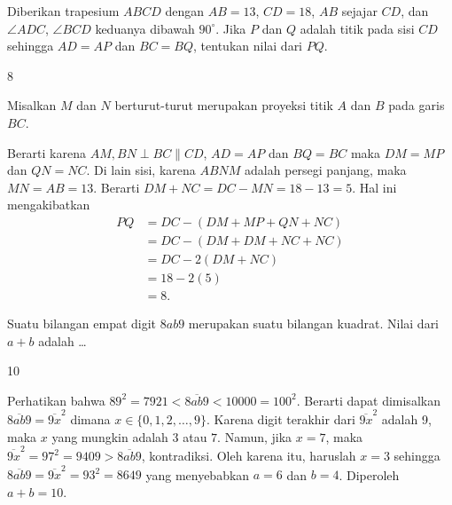 \begin{soalbaru}
Diberikan trapesium $ABCD$ dengan $AB = 13$, $CD = 18$, $AB$ sejajar $CD$,
dan $\angle ADC$, $\angle BCD$ keduanya dibawah $90^\circ$. Jika $P$ dan $Q$ adalah titik pada sisi $CD$ sehingga $AD = AP$ dan $BC = BQ$, tentukan nilai dari $PQ$.
\end{soalbaru}
\begin{jawaban}
8
\end{jawaban}
\begin{solusi}
Misalkan $M$ dan $N$ berturut-turut merupakan proyeksi titik $A$ dan $B$ pada garis $BC$. 
\begin{center}
\end{center}
Berarti karena $AM, BN \perp BC \parallel CD$, $AD=AP$ dan $BQ=BC$ maka $DM=MP$ dan $QN=NC$. Di lain sisi, karena $ABNM$ adalah persegi panjang, maka $MN=AB=13$. Berarti $DM+NC=DC-MN=18-13=5$. Hal ini mengakibatkan 
\begin{align*}
PQ &= DC-(DM+MP+QN+NC)\\
&= DC - (DM+DM+NC+NC)\\
&= DC-2(DM+NC)\\
&= 18 - 2(5)\\
&= \boxed{8}.
\end{align*}
\end{solusi}

\begin{soalbaru}
Suatu bilangan empat digit $8ab9$ merupakan suatu bilangan kuadrat. Nilai dari $a+b$ adalah \dots
\end{soalbaru}
\begin{jawaban}
10
\end{jawaban}
\begin{solusi}
Perhatikan bahwa $89^2 = 7921 < \overline{8ab9} < 10000 = 100^2$. Berarti dapat dimisalkan $\overline{8ab9} = \overline{9x}^2$ dimana $x \in \{0,1,2,\dots, 9\}$. Karena digit terakhir dari $\overline{9x}^2$ adalah 9, maka $x$ yang mungkin adalah $3$ atau $7$. Namun, jika $x = 7$, maka $\overline{9x}^2 = 97^2 = 9409 > \overline{8ab9}$, kontradiksi. Oleh karena itu, haruslah $x=3$ sehingga $\overline{8ab9}=\overline{9x}^2 = 93^2 = 8649$ yang menyebabkan $a=6$ dan $b=4$. Diperoleh $a+b = \boxed{10}$.
\end{solusi}

